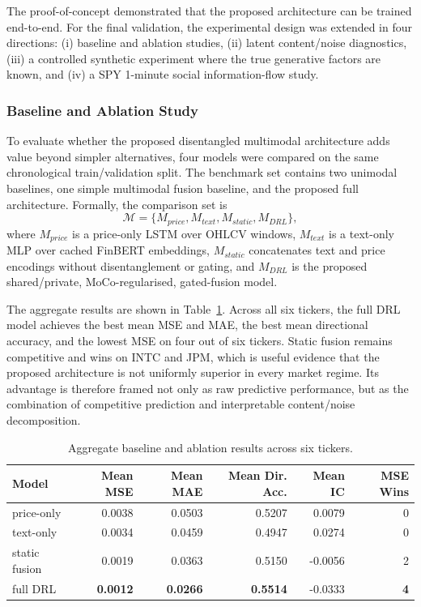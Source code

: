 \documentclass[12pt, a4paper]{article}
\begin{document}
The proof-of-concept demonstrated that the proposed architecture can be trained end-to-end. For the final validation, the experimental design was extended in four directions: (i) baseline and ablation studies, (ii) latent content/noise diagnostics, (iii) a controlled synthetic experiment where the true generative factors are known, and (iv) a SPY 1-minute social information-flow study.

\subsubsection{Baseline and Ablation Study}

To evaluate whether the proposed disentangled multimodal architecture adds value beyond simpler alternatives, four models were compared on the same chronological train/validation split. The benchmark set contains two unimodal baselines, one simple multimodal fusion baseline, and the proposed full architecture. Formally, the comparison set is
\[
    \mathcal{M}=\{M_{price}, M_{text}, M_{static}, M_{DRL}\},
\]
where $M_{price}$ is a price-only LSTM over OHLCV windows, $M_{text}$ is a text-only MLP over cached FinBERT embeddings, $M_{static}$ concatenates text and price encodings without disentanglement or gating, and $M_{DRL}$ is the proposed shared/private, MoCo-regularised, gated-fusion model.

The aggregate results are shown in Table~\ref{tab:baseline_ablation}. Across all six tickers, the full DRL model achieves the best mean MSE and MAE, the best mean directional accuracy, and the lowest MSE on four out of six tickers. Static fusion remains competitive and wins on INTC and JPM, which is useful evidence that the proposed architecture is not uniformly superior in every market regime. Its advantage is therefore framed not only as raw predictive performance, but as the combination of competitive prediction and interpretable content/noise decomposition.

\begin{table}[htbp]
\centering
\caption{Aggregate baseline and ablation results across six tickers.}
\label{tab:baseline_ablation}
\small
\setlength{\tabcolsep}{5pt}
\begin{tabular}{lrrrrr}
\toprule
\textbf{Model} & \textbf{Mean MSE} & \textbf{Mean MAE} & \textbf{Mean Dir. Acc.} & \textbf{Mean IC} & \textbf{MSE Wins} \\
\midrule
price-only & 0.0038 & 0.0503 & 0.5207 & 0.0079 & 0 \\
text-only & 0.0034 & 0.0459 & 0.4947 & 0.0274 & 0 \\
static fusion & 0.0019 & 0.0363 & 0.5150 & -0.0056 & 2 \\
full DRL & \textbf{0.0012} & \textbf{0.0266} & \textbf{0.5514} & -0.0333 & \textbf{4} \\
\bottomrule
\end{tabular}
\end{table}
\end{document}
